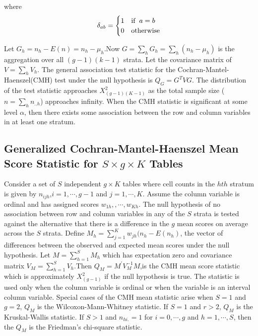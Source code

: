 \documentclass[12pt,oneside]{report}
\theoremstyle{definition}
\theoremstyle{mystyle}
\begin{document}
where
\[ \delta_{ab}=\begin{cases}
1 & \mbox{if} \hspace{2mm} a=b  \\
0 & \mbox{otherwise}\\
\end{cases}
\]

Let  $G_{h}=n_{h}-E(n)=n_{h}-\mu_{h}$.Now $G=\sum\limits_{h}G_{h}=\sum\limits_{h}(n_{h}-\mu_{h})$ is the aggregation over all $(g-1)(k-1)$ strata. Let the covariance matrix of $V=\sum\limits_{h}V_{h}$. The general association test  statistic for the Cochran-Mantel-Haenszel(CMH) test under the null hypothesis is $Q_{G}=G^{T}VG$. The  distribution of the test statistic approaches $X_{(g-1)(K-1)}^{2}$ as the total sample size ($n=\sum\limits_{h}n_{..h}$) approaches infinity. When the CMH statistic is significant at some level $\alpha$, then there exists some association between the row and column variables in at least one stratum.

\subsection{Generalized Cochran-Mantel-Haenszel Mean Score  Statistic for $S\times g\times K$ Tables}
Consider a set of $S$ independent $g\times K$ tables where cell counts in the $hth$ stratum is given by $n_{ijh}$,$i=1,\cdots,g-1$ and $j=1,\cdots,K$. Assume the column variable is  ordinal and has assigned scores $w_{1h},,\cdots,w_{Kh}$. The null hypothesis of  no association between row and column variables in any of the $S$ strata is tested against the alternative that there is a difference in the $g$ mean scores on average across the $S$ strata. Define $M_{h}=\sum\limits_{j=1}^{K} w_{jh}(n_{h}-E(n_{h})$, the vector of differences between the observed and expected mean scores under the null hypothesis. Let $M=\sum\limits_{h=1}^{S}M_{h}$ which has expectation zero and covariance matrix $V_{M}=\sum\limits_{h=1}^{S}V_{h}$.Then $Q_{M}=M^{\prime}V_{M}^{-1}M$,is the CMH mean score statistic which is approximately $X_{(g-1)}^{2}$ if  the null hypothesis is true. The statistic is used only when the column variable is ordinal or when the variable is  an interval column variable. Special cases of the CMH mean statistic arise when $S=1$ and $g=2$, $Q_{M}$ is the Wilcoxon-Mann-Whitney statistic. If $S=1$ and $r>2$, $Q_{M}$ is the Kruskal-Wallis statistic. If $S>1$ and $n_{hi.}=1$ for $i=0,\cdots,g$ and $h=1,\cdots,S$, then the $Q_{M}$ is the Friedman's chi-square statistic.
\end{document}
